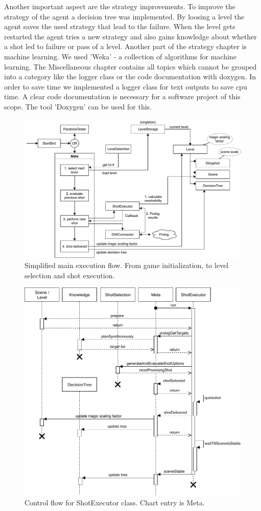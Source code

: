 Another important aspect are the strategy improvements. To improve the strategy of the agent a decision tree was implemented. By loosing a level the agent saves the used strategy that lead to the failure. When the level gets restarted the agent tries a new strategy and also gains knowledge about whether a shot led to failure or pass of a level. Another part of the strategy chapter is machine learning.
We used 'Weka' - a collection of algorithms for machine learning.
The Miscellaneous chapter contains all topics which cannot be grouped into a category like the logger class or the code documentation with doxygen. In order to save time we implemented a logger class for text outputs to save cpu time.
A clear code documentation is necessary for a software project of this scope. The tool 'Doxygen' can be used for this. 
\begin{figure}
	\centering
	\includegraphics[width=\textwidth]{img/diagram-classes}
	\caption{Simplified main execution flow. From game initialization, to level selection and shot execution.}
	\label{img:intro:classes}
\end{figure}

\begin{figure}
	\centering
	\includegraphics[width=\textwidth]{img/diagram-shotexecuter}
	\caption{Control flow for ShotExecutor class. Chart entry is Meta.}
	\label{img:intro:shotexecuter}
\end{figure}
